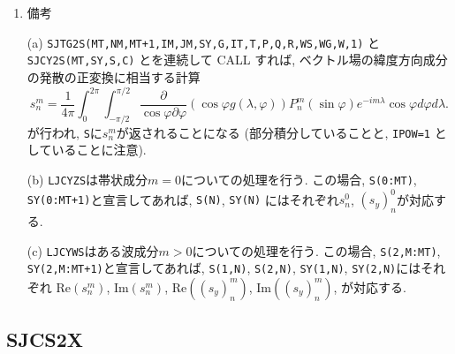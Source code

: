 \documentclass[a4j]{jarticle}
\newcommand{\re}{\mbox{Re}}
\newcommand{\im}{\mbox{Im}}
\begin{document}
\begin{enumerate}
\item 備考

(a) {\tt SJTG2S(MT,NM,MT+1,IM,JM,SY,G,IT,T,P,Q,R,WS,WG,W,1)} と
    {\tt SJCY2S(MT,SY,S,C)} とを連続して CALL すれば,
    ベクトル場の緯度方向成分の発散の正変換に相当する計算
\begin{equation}
s^m_n=\frac1{4\pi}\int^{2\pi}_0\int^{\pi/2}_{-\pi/2}
\frac{\partial}{\cos\varphi\partial\varphi}
\left(\cos\varphi g(\lambda,\varphi)\right)
P^m_n(\sin\varphi)
e^{-im\lambda}\cos\varphi d\varphi
d\lambda .
\end{equation}
が行われ, {\tt S}に$s^m_n$が返されることになる
(部分積分していることと, {\tt IPOW=1} としていることに注意).

(b) {\tt LJCYZS}は帯状成分$m=0$についての処理を行う.
    この場合,
    {\tt S(0:MT)}, {\tt SY(0:MT+1)}と宣言してあれば, {\tt S(N)}, {\tt SY(N)}
    にはそれぞれ$s^0_n$, $(s_y)^0_n$が対応する.

(c) {\tt LJCYWS}はある波成分$m>0$についての処理を行う.
    この場合,
    {\tt S(2,M:MT)}, {\tt SY(2,M:MT+1)}と宣言してあれば, 
    {\tt S(1,N)}, {\tt S(2,N)}, {\tt SY(1,N)}, {\tt SY(2,N)}にはそれぞれ
    $\re(s^m_n)$, $\im(s^m_n)$, $\re((s_y)^m_n)$, $\im((s_y)^m_n)$, 
    が対応する.
    
\end{enumerate}


\subsection{SJCS2X}
\end{document}
